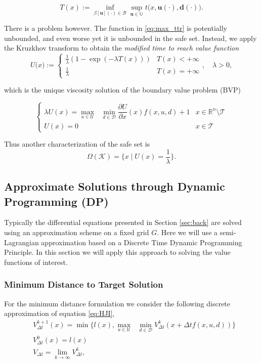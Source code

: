 \documentclass{journal}
\newcommand{\B}{\mathcal{B}}
\newcommand{\D}{\mathcal{D}}
\newcommand{\K}{\mathcal{K}}
\newcommand{\T}{\mathcal{T}}
\newcommand{\U}{\mathcal{U}}
\newcommand{\RR}{\mathbb{R}}
\newcommand{\UU}{\mathbb{U}}
\newcommand{\bu}{\bm{u}}
\newcommand{\bdelta}{\bm{d}}
\begin{document}
\begin{equation} \label{eq:max_ttr}
T(x):=\inf_{\beta[\bu](\cdot) \in \B} \sup_{\bu \in \UU}t\big(x,\bu(\cdot),\bdelta(\cdot)\big) .
\end{equation}

There is a problem however. The function in \ref{eq:max_ttr} is potentially unbounded, and even worse yet it is unbounded in the safe set. Instead, we apply the Kruzkhov transform to obtain the \emph{modified time to reach value function}
\begin{equation}\label{eq:t}
U\big(x) :=
\begin{cases} 
\frac{1}{\lambda}(1-\exp(-\lambda T(x))) & T(x) < +\infty \\
\frac{1}{\lambda} & T(x) = +\infty 
\end{cases}, \quad \lambda >0,
\end{equation}

\noindent which is the unique viscosity solution of the boundary value problem (BVP)

\begin{equation}\label{eq:HJI_2}
\begin{cases}
\lambda U(x) = \underset{u\in\U}{\max}\text{ }\underset{ d\in\D}{\min} \! \dfrac{\partial U}{\partial x}(x) f(x,u,d) +1 & x\in \RR^n \setminus \T\\
U(x) = 0 & x \in \mathcal{T}
\end{cases}
\end{equation}

Thus another characterization of the safe set is
\begin{equation}
\Omega(\K) = \{x \mid U(x) = \frac{1}{\lambda}\}.
\end{equation}  

\subsection{Approximate Solutions through Dynamic Programming (DP)} \label{sec:solns}

Typically the differential equations presented in Section \ref{sec:back} are solved using an approximation scheme on a fixed grid $G$. Here we will use a semi-Lagrangian approximation based on a Discrete Time Dynamic Programming Principle. In this section we will apply this approach to solving the value functions of interest. 

\subsubsection{Minimum Distance to Target Solution}
For the minimum distance formulation we consider the following discrete approximation of equation \ref{eq:HJI},
\begin{subequations}
\begin{align}
&V_{\Delta t}^{k+1}(x) = \min\{l(x),  \underset{u\in\U}{\max}\text{ }\underset{ d\in\D}{\min} V^{k}_{\Delta t}(x+\Delta t f(x,u,d))\}\\
&V_{\Delta t}^{0}(x) = l(x)\\
&V_{\Delta t} = \lim_{k\rightarrow \infty} V^{k}_{\Delta t},
\end{align}
\end{subequations}
\end{document}
